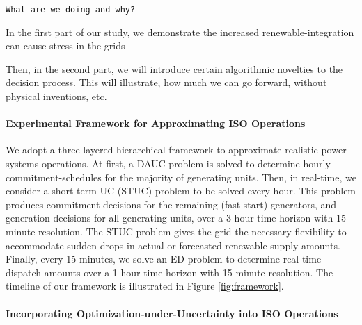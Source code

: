 \documentclass[11pt,a4paper]{article}
\begin{document}

\texttt{What are we doing and why?}

In the first part of our study, we demonstrate the increased renewable-integration can cause stress in the grids

\cite{Olson2015}

Then, in the second part, we will introduce certain algorithmic novelties to the decision process. This will illustrate, how much we can go forward, without physical inventions, etc. 

\paragraph{Experimental Framework for Approximating ISO Operations}
We adopt a three-layered hierarchical framework to approximate realistic power-systems operations. At first, a DAUC problem is solved to determine hourly commitment-schedules for the majority of generating units.
Then, in real-time, we consider a short-term UC (STUC) problem to be solved every hour. This problem produces commitment-decisions for the remaining (fast-start) generators, and generation-decisions for all generating units, over a 3-hour time horizon with 15-minute resolution. The STUC problem gives the grid the necessary flexibility to accommodate sudden drops in actual or forecasted renewable-supply amounts. Finally, every 15 minutes, we solve an ED problem to determine real-time dispatch amounts over a 1-hour time horizon with 15-minute resolution. The timeline of our framework is illustrated in Figure \ref{fig:framework}.

\paragraph{Incorporating Optimization-under-Uncertainty into ISO Operations}
\end{document}
